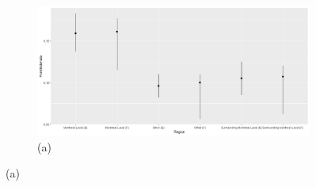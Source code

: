 \captionsetup[subfigure]{labelformat=empty}
\begin{figure}[ht!]
\centering
\begin{subfigure}[b]{\columnwidth} 
    \includegraphics[width=\columnwidth]{../../plot/intervals.png}
    \caption{(a)}
\end{subfigure}
\end{figure}